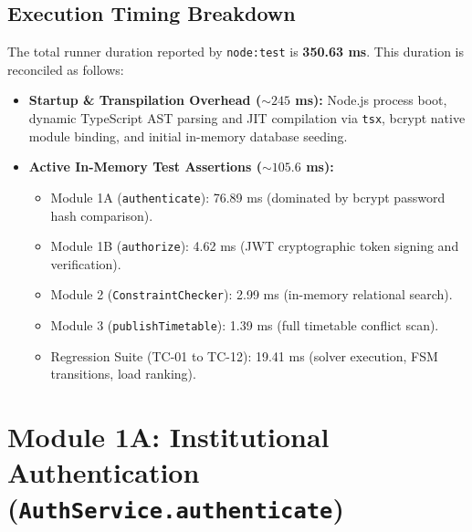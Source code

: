 \documentclass[11pt,a4paper]{article}
\begin{document}
\subsection{Execution Timing Breakdown}
The total runner duration reported by \texttt{node:test} is \textbf{350.63 ms}. This duration is reconciled as follows:
\begin{itemize}
    \item \textbf{Startup \& Transpilation Overhead ($\sim 245$ ms):} Node.js process boot, dynamic TypeScript AST parsing and JIT compilation via \texttt{tsx}, bcrypt native module binding, and initial in-memory database seeding.
    \item \textbf{Active In-Memory Test Assertions ($\sim 105.6$ ms):}
    \begin{itemize}
        \item Module 1A (\texttt{authenticate}): 76.89 ms (dominated by bcrypt password hash comparison).
        \item Module 1B (\texttt{authorize}): 4.62 ms (JWT cryptographic token signing and verification).
        \item Module 2 (\texttt{ConstraintChecker}): 2.99 ms (in-memory relational search).
        \item Module 3 (\texttt{publishTimetable}): 1.39 ms (full timetable conflict scan).
        \item Regression Suite (TC-01 to TC-12): 19.41 ms (solver execution, FSM transitions, load ranking).
    \end{itemize}
\end{itemize}

\newpage
\section{Module 1A: Institutional Authentication (\texttt{AuthService.authenticate})}
\end{document}

